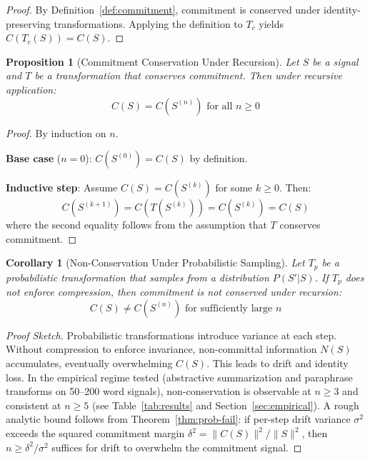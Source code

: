 \documentclass[11pt,a4paper]{article}
\newtheorem{corollary}[theorem]{Corollary}
\newtheorem{proposition}[theorem]{Proposition}
\begin{document}
\begin{proof}
By Definition~\ref{def:commitment}, commitment is conserved under identity-preserving transformations. Applying the definition to $T_c$ yields $C(T_c(S)) = C(S)$.
\end{proof}

\begin{proposition}[Commitment Conservation Under Recursion]
\label{prop:recursion}
Let $S$ be a signal and $T$ be a transformation that conserves commitment. Then under recursive application:
\begin{equation}
C(S) = C(S^{(n)}) \text{ for all } n \geq 0
\end{equation}
\end{proposition}

\begin{proof}
By induction on $n$.

\textbf{Base case} ($n = 0$): $C(S^{(0)}) = C(S)$ by definition.

\textbf{Inductive step}: Assume $C(S) = C(S^{(k)})$ for some $k \geq 0$. Then:
\begin{equation}
C(S^{(k+1)}) = C(T(S^{(k)})) = C(S^{(k)}) = C(S)
\end{equation}
where the second equality follows from the assumption that $T$ conserves commitment.
\end{proof}

\begin{corollary}[Non-Conservation Under Probabilistic Sampling]
\label{cor:probabilistic}
Let $T_p$ be a probabilistic transformation that samples from a distribution $P(S'|S)$. If $T_p$ does not enforce compression, then commitment is not conserved under recursion:
\begin{equation}
C(S) \neq C(S^{(n)}) \text{ for sufficiently large } n
\end{equation}
\end{corollary}

\begin{proof}[Proof Sketch]
Probabilistic transformations introduce variance at each step. Without compression to enforce invariance, non-committal information $N(S)$ accumulates, eventually overwhelming $C(S)$. This leads to drift and identity loss. In the empirical regime tested (abstractive summarization and paraphrase transforms on 50--200 word signals), non-conservation is observable at $n \geq 3$ and consistent at $n \geq 5$ (see Table~\ref{tab:results} and Section~\ref{sec:empirical}). A rough analytic bound follows from Theorem~\ref{thm:prob-fail}: if per-step drift variance $\sigma^2$ exceeds the squared commitment margin $\delta^2 = \| C(S) \|^2 / \| S \|^2$, then $n \geq \delta^2 / \sigma^2$ suffices for drift to overwhelm the commitment signal.
\end{proof}
\end{document}
